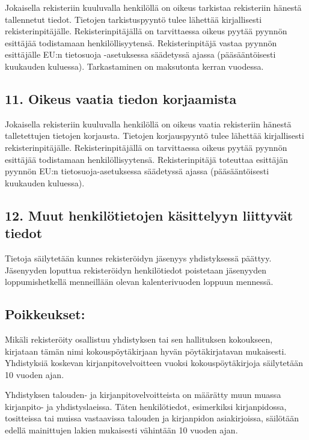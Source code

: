 \documentclass[finnish]{tktltiki}
\begin{document}
Jokaisella rekisteriin kuuluvalla henkilöllä on oikeus tarkistaa rekisteriin hänestä tallennetut tiedot. Tietojen tarkistuspyyntö tulee lähettää kirjallisesti rekisterinpitäjälle. Rekisterinpitäjällä on tarvittaessa oikeus pyytää pyynnön esittäjää todistamaan henkilöllisyytensä. Rekisterinpitäjä vastaa pyynnön esittäjälle EU:n tietosuoja -asetuksessa säädetyssä ajassa (pääsääntöisesti kuukauden kuluessa). Tarkastaminen on maksutonta kerran vuodessa.

\subsection*{11. Oikeus vaatia tiedon korjaamista}

Jokaisella rekisteriin kuuluvalla henkilöllä on oikeus vaatia rekisteriin hänestä talletettujen tietojen korjausta. Tietojen korjauspyyntö tulee lähettää kirjallisesti rekisterinpitäjälle. Rekisterinpitäjällä on tarvittaessa oikeus pyytää pyynnön esittäjää todistamaan henkilöllisyytensä. Rekisterinpitäjä toteuttaa esittäjän pyynnön EU:n tietosuoja-asetuksessa säädetyssä ajassa (pääsääntöisesti kuukauden kuluessa).

\subsection*{12. Muut henkilötietojen käsittelyyn liittyvät tiedot}

Tietoja säilytetään kunnes rekisteröidyn jäsenyys yhdistyksessä päättyy. Jäsenyyden loputtua rekisteröidyn henkilötiedot poistetaan jäsenyyden loppumishetkellä menneillään olevan kalenterivuoden loppuun mennessä.

\subsection*{Poikkeukset:}

Mikäli rekisteröity osallistuu yhdistyksen tai sen hallituksen kokoukseen, kirjataan tämän nimi kokouspöytäkirjaan hyvän pöytäkirjatavan mukaisesti. Yhdistyksiä koskevan kirjanpitovelvoitteen vuoksi kokouspöytäkirjoja säilytetään 10 vuoden ajan.

Yhdistyksen talouden- ja kirjanpitovelvoitteista on määrätty muun muassa kirjanpito- ja yhdistyslaeissa. Täten henkilötiedot, esimerkiksi kirjanpidossa, tositteissa tai muissa vastaavissa talouden ja kirjanpidon asiakirjoissa, säilötään edellä mainittujen lakien mukaisesti vähintään 10 vuoden ajan.
\end{document}
